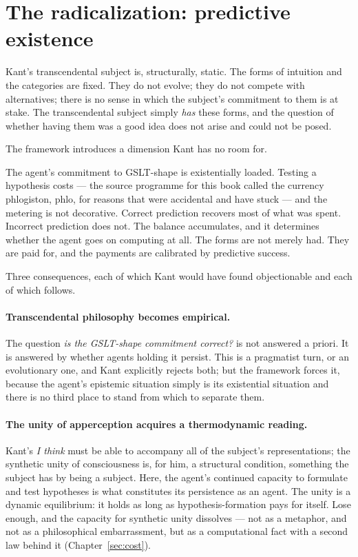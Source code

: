 \section{The radicalization: predictive existence}
\label{sec:kant-radical}

Kant's transcendental subject is, structurally, static.
The forms of intuition and the categories are fixed.
They do not evolve; they do not compete with alternatives; there is
no sense in which the subject's commitment to them is at stake.
The transcendental subject simply \emph{has} these forms, and the
question of whether having them was a good idea does not arise and
could not be posed.

The framework introduces a dimension Kant has no room for.

The agent's commitment to GSLT-shape is existentially loaded.
Testing a hypothesis costs --- the source programme for this book
called the currency phlogiston, phlo, for reasons that were
accidental and have stuck --- and the metering is not decorative.
Correct prediction recovers most of what was spent.
Incorrect prediction does not.
The balance accumulates, and it determines whether the agent goes
on computing at all.
The forms are not merely had.
They are paid for, and the payments are calibrated by predictive
success.

Three consequences, each of which Kant would have found
objectionable and each of which follows.

\paragraph{Transcendental philosophy becomes empirical.}
The question \emph{is the GSLT-shape commitment correct?} is not
answered a priori.
It is answered by whether agents holding it persist.
This is a pragmatist turn, or an evolutionary one, and Kant
explicitly rejects both; but the framework forces it, because the
agent's epistemic situation simply is its existential situation and
there is no third place to stand from which to separate them.

\paragraph{The unity of apperception acquires a thermodynamic reading.}
Kant's \emph{I think} must be able to accompany all of the
subject's representations; the synthetic unity of consciousness is,
for him, a structural condition, something the subject has by being
a subject.
Here, the agent's continued capacity to formulate and test
hypotheses is what constitutes its persistence as an agent.
The unity is a dynamic equilibrium: it holds as long as
hypothesis-formation pays for itself.
Lose enough, and the capacity for synthetic unity dissolves --- not
as a metaphor, and not as a philosophical embarrassment, but as a
computational fact with a second law behind it
(Chapter~\ref{sec:cost}).

